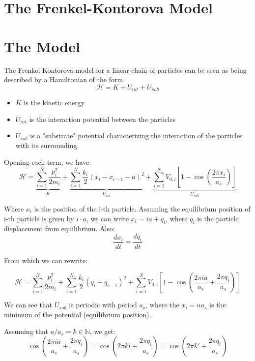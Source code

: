 \section{The Frenkel-Kontorova Model}

\section{The Model}

The Frenkel Kontorova model for a linear chain of particles can be seen as being described by a Hamiltonian of the form 
\[ \mathcal{H} = K + U_{int} + U_{sub} \]

\begin{itemize}
	\item $ K $ is the kinetic energy
	\item $ U_{int} $ is the interaction potential between the particles
	\item $ U_{sub} $ is a "substrate" potential characterizing the interaction of the particles with its surrounding.
\end{itemize}

Opening each term, we have:
\[ 
\mathcal{H} = \underbrace{\sum_{i=1}^{N}\frac{p_{i}^{2}}{2m_i}}_{K} + 
\underbrace{\sum_{i=1}^{N} \frac{k_i}{2}(x_{i} - x_{i-1} - a)^{2}}_{U_{int}} +
\underbrace{\sum_{i=1}^{N} V_{0,i}\left[1 - \cos \left( \frac{2\pi x_{i}}{a_{s}}\right)\right]}_{U_{sub}}
\]

Where $ x_i $ is the position of the i-th particle. Assuming the equilibrium position of i-th particle is given by $ i\cdot a $, we can write $ x_i = ia + q_{i}$, where $ q_{i} $ is the particle displacement from equilibrium. Also:
\[ \frac{dx_{i}}{dt} =  \frac{dq_{i}}{dt}\]

From which we can rewrite:

\[ 
\mathcal{H} = \sum_{i=1}^{N}\frac{p_{i}^{2}}{2m_i} + 
\sum_{i=1}^{N} \frac{k_i}{2}(q_{i} - q_{i-1})^{2} +
\sum_{i=1}^{N} V_{0,i}\left[1 - 
\cos \left( \frac{2\pi i a}{a_{s}} + \frac{2\pi q_{i}}{a_{s}}\right)\right]
\]

We can see that $ U_{sub} $ is periodic with period $ a_s $, where the $ x_i = n a_s $ is the minimum of the potential (equilibrium position).

Assuming that $ a/a_s = k\in \mathbb{N} $, we get:
\[ 
\cos \left( \frac{2\pi i a}{a_{s}} + \frac{2\pi q_{i}}{a_{s}}\right) = 
\cos \left( 2\pi k i  + \frac{2\pi q_{i}}{a_{s}}\right) = 
\cos \left( 2\pi k'  + \frac{2\pi q_{i}}{a_{s}}\right)
\]

